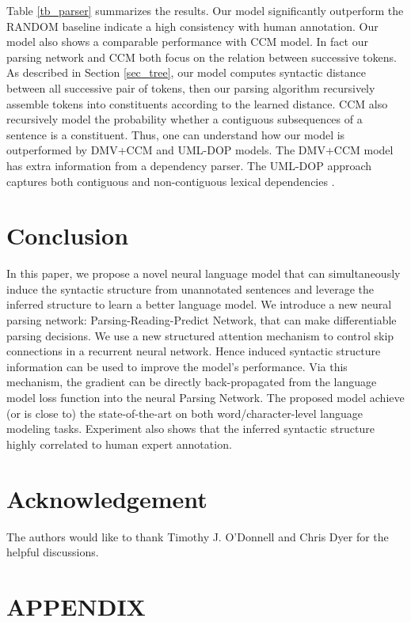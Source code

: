 \documentclass{article} \usepackage{iclr2018_conference,times}
\begin{document}
Table \ref{tb_parser} summarizes the results. Our model significantly outperform the RANDOM baseline indicate a high consistency with human annotation. Our model also shows a comparable performance with CCM model. In fact our parsing network and CCM both focus on the relation between successive tokens.  As described in Section \ref{sec_tree}, our model computes syntactic distance between all successive pair of tokens, then our parsing algorithm recursively assemble tokens into constituents according to the learned distance. CCM also recursively model the probability whether a contiguous subsequences of a sentence is a constituent. Thus, one can understand how our model is outperformed by DMV+CCM and UML-DOP models. The DMV+CCM model has extra information from a dependency parser. The UML-DOP approach captures both contiguous and non-contiguous lexical dependencies \citep{bod2006all}.

\section{Conclusion}
In this paper, we propose a novel neural language model that can simultaneously induce the syntactic structure from unannotated sentences and leverage the inferred structure to learn a better language model. We introduce a new neural parsing network: Parsing-Reading-Predict Network, that can make differentiable parsing decisions. We use a new structured attention mechanism to control skip connections in a recurrent neural network. Hence induced syntactic structure information can be used to improve the model's performance. Via this mechanism, the gradient can be directly back-propagated from the language model loss function into the neural Parsing Network. The proposed model achieve (or is close to) the state-of-the-art on both word/character-level language modeling tasks. Experiment also shows that the inferred syntactic structure highly correlated to human expert annotation.

\section*{Acknowledgement}
The authors would like to thank Timothy J. O'Donnell and Chris Dyer for the helpful discussions.




\clearpage{}\section*{APPENDIX}
\appendix
\end{document}
